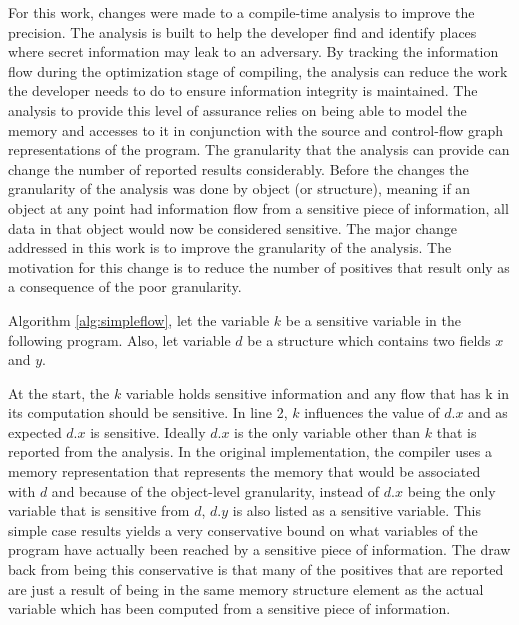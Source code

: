 \documentclass[11pt,a4paper]{article}
\begin{document}
  For this work, changes were made to a compile-time analysis to improve
  the precision. The analysis is built to help the developer find and identify
  places where secret information may leak to an adversary. By tracking the
  information flow during the optimization stage of compiling, the analysis can
  reduce the work the developer needs to do to ensure information integrity is
  maintained. The analysis to provide this level of assurance relies on being
  able to model the memory and accesses to it in conjunction with the source
  and control-flow graph representations of the program. The granularity
  that the analysis can provide can change the number of reported results
  considerably. Before the changes the granularity of the analysis was done
  by object (or structure), meaning if an object at any point had information
  flow from a sensitive piece of information, all data in that object would
  now be considered sensitive. The major change addressed in this work is to
  improve the granularity of the analysis. The motivation for this change is
  to reduce the number of positives that result only as a consequence of the
  poor granularity.


  Algorithm \ref{alg:simpleflow}, let the variable $k$ be a sensitive variable in the following program. Also, let
  variable $d$ be a structure which contains two fields $x$ and $y$. 

  \begin{algorithm}

  \end{algorithm}

  At the start, the $k$ variable holds sensitive information and any flow that has k
  in its computation should be sensitive. In line 2, $k$ influences the value of $d.x$
  and as expected $d.x$ is sensitive. Ideally $d.x$ is the only variable other
  than $k$ that is reported from the analysis. In the original implementation,
  the compiler uses a memory representation that represents the memory that would
  be associated with $d$ and because of the object-level granularity, instead of
  $d.x$ being the only variable that is sensitive from $d$, $d.y$ is also listed
  as a sensitive variable. This simple case results yields a very conservative
  bound on what variables of the program have actually been reached by a sensitive
  piece of information. The draw back from being this conservative is that many of
  the positives that are reported are just a result of being in the same memory
  structure element as the actual variable which has been computed from a
  sensitive piece of information.
\end{document}
